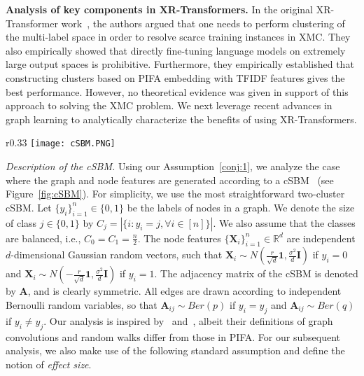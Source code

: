 \documentclass{article} \usepackage{iclr2022_conference,times}
\begin{document}
\textbf{Analysis of key components in XR-Transformers.}
In the original XR-Transformer work~\citep{jiong2021fast}, the authors argued that one needs to perform clustering of the multi-label space in order to resolve scarce training instances in XMC. They also empirically showed that directly fine-tuning language models on extremely large output spaces is prohibitive. Furthermore, they empirically established that constructing clusters based on PIFA embedding with TFIDF features gives the best performance. However, no theoretical evidence was given in support of this approach to solving the XMC problem. 
We next leverage recent advances in graph learning to analytically characterize the benefits of using XR-Transformers.

\begin{wrapfigure}{r}{0.33\textwidth}
    \centering
    \vspace{-\intextsep}
    \texttt{[image: cSBM.PNG]}
    \vspace{-0.8cm}
  \caption{Illustration of a cSBM: Node features are independent Gaussian random vectors while edges are modeled as independent Bernoulli random variables.}
  \label{fig:cSBM}
  \vspace{-\intextsep}
\end{wrapfigure}
\textit{Description of the cSBM. }Using our Assumption~\ref{conj:1}, we analyze the case where the graph and node features are generated according to a cSBM~\citep{deshpande2018contextual} (see Figure~\ref{fig:cSBM}). For simplicity, we use the most straightforward two-cluster cSBM. Let $\{y_i\}_{i=1}^n \in \{0,1\}$ be the labels of nodes in a graph. We denote the size of class $j \in \{{0,1\}}$ by $C_j=|\{i:y_i=j,\forall i\in [n]\}|$. We also assume that the classes are balanced, i.e., $C_0=C_1=\frac{n}{2}$. The node features $\{\mathbf{X}_i\}_{i=1}^n\in \mathbb{R}^{d}$ are independent $d$-dimensional Gaussian random vectors, such that $\mathbf{X}_i\sim N(\frac{r}{\sqrt{d}}\mathbf{1},\frac{\sigma^2}{d}\mathbf{I})$ if $y_i = 0$ and $\mathbf{X}_i\sim N(-\frac{r}{\sqrt{d}}\mathbf{1},\frac{\sigma^2}{d}\mathbf{I})$ if $y_i = 1$. The adjacency matrix of the cSBM is denoted by $\mathbf{A}$, and is clearly symmetric. All edges are drawn according to independent Bernoulli random variables, so that $\mathbf{A}_{ij} \sim Ber(p)$ if $y_i=y_j$ and $\mathbf{A}_{ij} \sim Ber(q)$ if $y_i\neq y_j$. Our analysis is inspired by~\cite{baranwal2021graph} and~\cite{li2019optimizing}, albeit their definitions of graph convolutions and random walks differ from those in PIFA. For our subsequent analysis, we also make use of the following standard assumption and define the notion of \emph{effect size}.
\end{document}
